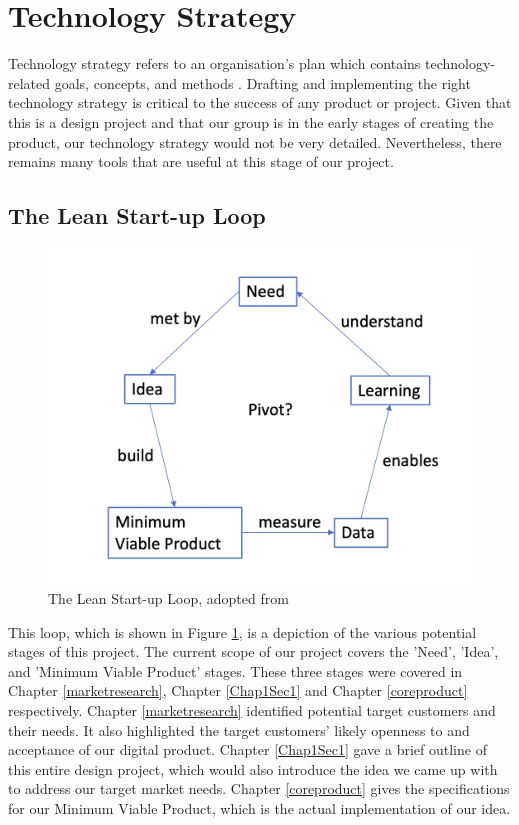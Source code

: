 \section{Technology Strategy}

Technology strategy refers to an organisation's plan which contains technology-related goals, concepts, and methods \cite{techstratdefinition}. Drafting and implementing the right technology strategy is critical to the success of any product or project. Given that this is a design project and that our group is in the early stages of creating the product, our technology strategy would not be very detailed. Nevertheless, there remains many tools that are useful at this stage of our project.

\subsection{The Lean Start-up Loop}

\begin{figure}
    \centering
    \includegraphics[scale=0.4]{Figures/Lean Startup loop}
    \decoRule
    \caption{The Lean Start-up Loop, adopted from \protect\cite{leanstartuploop}}
    \label{fig:leanloop}
    \end{figure}
    

This loop, which is shown in Figure \ref{fig:leanloop}, is a depiction of the various potential stages of this project. The current scope of our project covers the 'Need', 'Idea', and 'Minimum Viable Product' stages. These three stages were covered in Chapter \ref{marketresearch}, Chapter \ref{Chap1Sec1} and Chapter \ref{coreproduct} respectively. Chapter \ref{marketresearch} identified potential target customers and their needs. It also highlighted the target customers' likely openness to and acceptance of our digital product. Chapter \ref{Chap1Sec1} gave a brief outline of this entire design project, which would also introduce the idea we came up with to address our target market needs. Chapter \ref{coreproduct} gives the specifications for our Minimum Viable Product, which is the actual implementation of our idea. 

